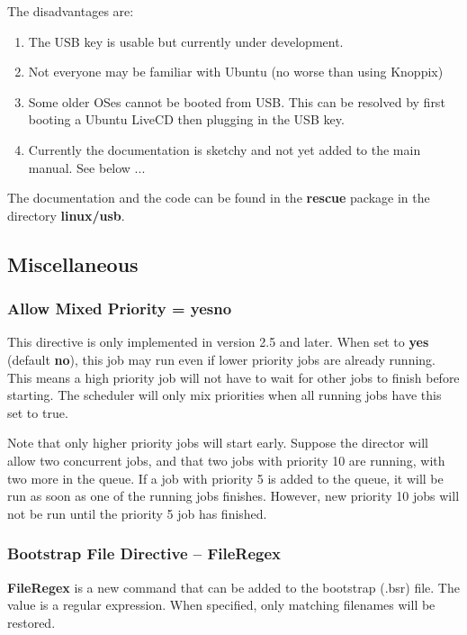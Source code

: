The disadvantages are:
\begin{enumerate}
\item The USB key is usable but currently under development.
\item Not everyone may be familiar with Ubuntu (no worse
  than using Knoppix)
\item Some older OSes cannot be booted from USB. This can
   be resolved by first booting a Ubuntu LiveCD then plugging
   in the USB key.
\item Currently the documentation is sketchy and not yet added
   to the main manual. See below ...
\end{enumerate}

The documentation and the code can be found in the {\bf rescue} package
in the directory {\bf linux/usb}.

\subsection{Miscellaneous}

\subsubsection{Allow Mixed Priority = \lt{}yes\vb{}no\gt{}}
   This directive is only implemented in version 2.5 and later.  When
   set to {\bf yes} (default {\bf no}), this job may run even if lower
   priority jobs are already running.  This means a high priority job
   will not have to wait for other jobs to finish before starting.
   The scheduler will only mix priorities when all running jobs have
   this set to true.

   Note that only higher priority jobs will start early.  Suppose the
   director will allow two concurrent jobs, and that two jobs with
   priority 10 are running, with two more in the queue.  If a job with
   priority 5 is added to the queue, it will be run as soon as one of
   the running jobs finishes.  However, new priority 10 jobs will not
   be run until the priority 5 job has finished.

\subsubsection{Bootstrap File Directive -- FileRegex}
  {\bf FileRegex} is a new command that can be added to the bootstrap
  (.bsr) file.  The value is a regular expression.  When specified, only
  matching filenames will be restored.

